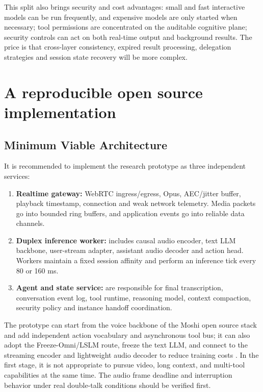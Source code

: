 \documentclass[UTF8,fontset=none,a4paper,10pt]{ctexart}
\begin{document}
This split also brings security and cost advantages: small and fast interactive models can be run frequently, and expensive models are only started when necessary; tool permissions are concentrated on the auditable cognitive plane; security controls can act on both real-time output and background results. The price is that cross-layer consistency, expired result processing, delegation strategies and session state recovery will be more complex.

\section{A reproducible open source implementation}

\subsection{Minimum Viable Architecture}

It is recommended to implement the research prototype as three independent services:

\begin{enumerate}
\item \textbf{Realtime gateway: }WebRTC ingress/egress, Opus, AEC/jitter buffer, playback timestamp, connection and weak network telemetry. Media packets go into bounded ring buffers, and application events go into reliable data channels.
\item \textbf{Duplex inference worker: } includes causal audio encoder, text LLM backbone, user-stream adapter, assistant audio decoder and action head. Workers maintain a fixed session affinity and perform an inference tick every 80 or 160 ms.
\item \textbf{Agent and state service: } are responsible for final transcription, conversation event log, tool runtime, reasoning model, context compaction, security policy and instance handoff coordination.
\end{enumerate}

The prototype can start from the voice backbone of the Moshi open source stack \cite{en:defossez2024moshi} and add independent action vocabulary and asynchronous tool bus; it can also adopt the Freeze-Omni/LSLM route, freeze the text LLM, and connect to the streaming encoder and lightweight audio decoder to reduce training costs \cite{en:wang2024freezeomni,en:ma2025lslm}. In the first stage, it is not appropriate to pursue video, long context, and multi-tool capabilities at the same time. The audio frame deadline and interruption behavior under real double-talk conditions should be verified first.
\end{document}
